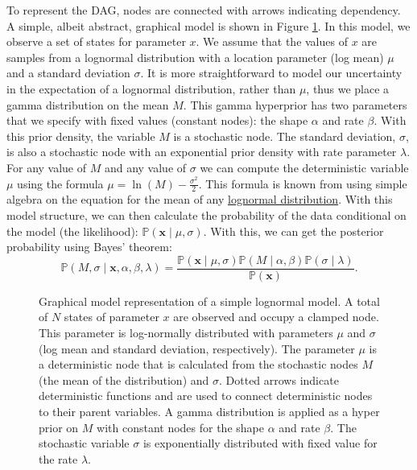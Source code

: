 \documentclass[11pt]{article}
\begin{document}
To represent the DAG, nodes are connected with arrows indicating dependency. 
A simple, albeit abstract, graphical model is shown in Figure \ref{simpleGM}. 
In this model, we observe a set of states for parameter $x$. 
We assume that the values of $x$ are samples from a lognormal distribution with a location parameter (log mean) $\mu$ and a standard deviation $\sigma$. 
It is more straightforward to model our uncertainty in the expectation of a lognormal distribution, rather than $\mu$, thus we place a gamma distribution on the mean $M$. 
This gamma hyperprior has two parameters that we specify with fixed values (constant nodes): the shape $\alpha$ and rate $\beta$. 
With this prior density, the variable $M$ is a stochastic node.
The standard deviation, $\sigma$, is also a stochastic node with an exponential prior density with rate parameter $\lambda$.
For any value of $M$ and any value of $\sigma$ we can compute the deterministic variable $\mu$ using the formula $\mu = \ln(M) - \frac{\sigma^2}{2}$. 
This formula is known from using simple algebra on the equation for the mean of any \href{http://en.wikipedia.org/wiki/Log-normal_distribution}{lognormal distribution}.
With this model structure, we can then calculate the probability of the data conditional on the model (the likelihood): 
$\mathbb{P}(\boldsymbol{x} \mid \mu, \sigma)$. With this, we can get the posterior probability using Bayes' theorem:
$$\mathbb{P}(M,\sigma \mid \boldsymbol{x}, \alpha, \beta, \lambda) = \frac{\mathbb{P}(\boldsymbol{x} \mid \mu, \sigma) \mathbb{P}(M \mid \alpha,\beta) \mathbb{P}(\sigma \mid \lambda)}{\mathbb{P}(\boldsymbol{x})}.$$
\begin{figure}[h!]
\centering
{}
\caption{\small Graphical model representation of a simple lognormal model. A total of $N$ states of parameter $x$ are observed and occupy a clamped node. 
This parameter is log-normally distributed with parameters $\mu$ and $\sigma$ (log mean and standard deviation, respectively). 
The parameter $\mu$ is a deterministic node that is calculated from the stochastic nodes $M$ (the mean of the distribution) and $\sigma$. 
Dotted arrows indicate deterministic functions and are used to connect deterministic nodes to their parent variables. 
A gamma distribution is applied as a hyper prior on $M$ with constant nodes for the shape $\alpha$ and rate $\beta$. 
The stochastic variable $\sigma$ is exponentially distributed with fixed value for the rate $\lambda$.
}
\label{simpleGM}
\end{figure}
\end{document}
